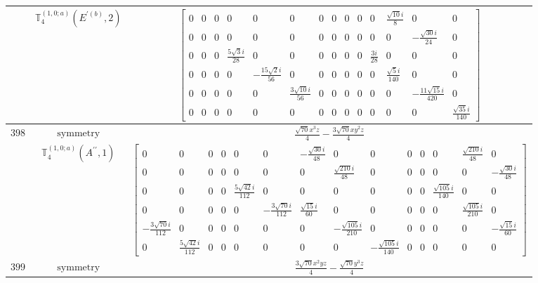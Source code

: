 \documentclass[fleqn,8pt,landscape]{jsarticle}
\begin{document}
\begin{longtable}{ccc}
$  $ & $ \mathbb{T}_{4}^{(1,0;a)}(E^{\prime(b)},2) $ & $ \begin{bmatrix} 0 & 0 & 0 & 0 & 0 & 0 & 0 & 0 & 0 & 0 & 0 & \frac{\sqrt{10} i}{8} & 0 & 0 \\ 0 & 0 & 0 & 0 & 0 & 0 & 0 & 0 & 0 & 0 & 0 & 0 & - \frac{\sqrt{30} i}{24} & 0 \\ 0 & 0 & 0 & \frac{5 \sqrt{3} i}{28} & 0 & 0 & 0 & 0 & 0 & 0 & \frac{3 i}{28} & 0 & 0 & 0 \\ 0 & 0 & 0 & 0 & - \frac{15 \sqrt{2} i}{56} & 0 & 0 & 0 & 0 & 0 & 0 & \frac{\sqrt{5} i}{140} & 0 & 0 \\ 0 & 0 & 0 & 0 & 0 & \frac{3 \sqrt{10} i}{56} & 0 & 0 & 0 & 0 & 0 & 0 & - \frac{11 \sqrt{15} i}{420} & 0 \\ 0 & 0 & 0 & 0 & 0 & 0 & 0 & 0 & 0 & 0 & 0 & 0 & 0 & \frac{\sqrt{35} i}{140} \end{bmatrix} $ \\ \hline
$ 398 $ & $ \text{symmetry} $ & $ \frac{\sqrt{70} x^{3} z}{4} - \frac{3 \sqrt{70} x y^{2} z}{4} $ \\
$  $ & $ \mathbb{T}_{4}^{(1,0;a)}(A^{\prime\prime},1) $ & $ \begin{bmatrix} 0 & 0 & 0 & 0 & 0 & 0 & - \frac{\sqrt{30} i}{48} & 0 & 0 & 0 & 0 & 0 & \frac{\sqrt{210} i}{48} & 0 \\ 0 & 0 & 0 & 0 & 0 & 0 & 0 & \frac{\sqrt{210} i}{48} & 0 & 0 & 0 & 0 & 0 & - \frac{\sqrt{30} i}{48} \\ 0 & 0 & 0 & 0 & \frac{5 \sqrt{42} i}{112} & 0 & 0 & 0 & 0 & 0 & 0 & \frac{\sqrt{105} i}{140} & 0 & 0 \\ 0 & 0 & 0 & 0 & 0 & - \frac{3 \sqrt{70} i}{112} & \frac{\sqrt{15} i}{60} & 0 & 0 & 0 & 0 & 0 & \frac{\sqrt{105} i}{210} & 0 \\ - \frac{3 \sqrt{70} i}{112} & 0 & 0 & 0 & 0 & 0 & 0 & - \frac{\sqrt{105} i}{210} & 0 & 0 & 0 & 0 & 0 & - \frac{\sqrt{15} i}{60} \\ 0 & \frac{5 \sqrt{42} i}{112} & 0 & 0 & 0 & 0 & 0 & 0 & - \frac{\sqrt{105} i}{140} & 0 & 0 & 0 & 0 & 0 \end{bmatrix} $ \\ \hline
$ 399 $ & $ \text{symmetry} $ & $ \frac{3 \sqrt{70} x^{2} y z}{4} - \frac{\sqrt{70} y^{3} z}{4} $ \\

\end{longtable}
\end{document}
